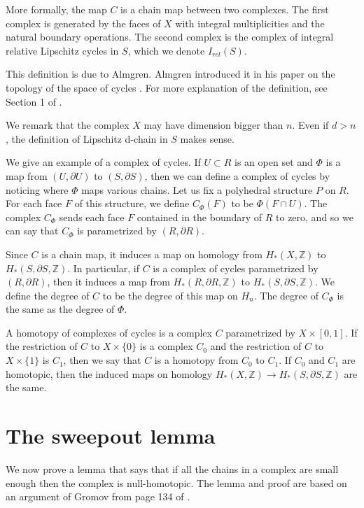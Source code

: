 \documentclass{amsart}
\newtheorem*{Theorem 1}{Theorem 1}
\newtheorem*{Theorem 2}{Theorem 2}
\newtheorem*{Estimate 1}{Estimate 1}
\newtheorem*{Estimate 2}{Estimate 2}
\newtheorem*{key lemma}{Key Lemma}
\numberwithin{equation}{section}
\begin{document}
More formally, the map $C$ is a chain map between two complexes. 
The first complex is generated by the faces of $X$ with integral
multiplicities and the natural boundary operations.  The second
complex is the complex of integral relative Lipschitz cycles in
$S$, which we denote $I_{rel}(S)$. 

This definition is due to Almgren.  Almgren introduced it in his
paper on the topology of the space of cycles \cite{A}.  
For more explanation of the definition, see Section 1 of \cite{G4}.

We remark that the complex $X$ may have dimension bigger than $n$.
Even if $d > n$, the definition of Lipschitz d-chain in $S$ makes
sense.

We give an example of a complex of cycles.  
If $U \subset R$ is an open set and $\Phi$ is a map
from $(U, \partial U)$ to $(S, \partial S)$, then we can define a
complex of cycles by noticing where $\Phi$ maps various chains. 
Let us fix a polyhedral structure $P$ on $R$.  For each face $F$
of this structure, we define $C_\Phi(F)$ to be $\Phi(F \cap U)$. 
The complex $C_\Phi$ sends each face $F$ contained in the
boundary of $R$ to zero, and so we can say that $C_\Phi$ is
parametrized by $(R, \partial R)$.

Since $C$ is a chain map, it induces a map on homology from
$H_*(X, \mathbb{Z})$ to $H_*(S, \partial S, \mathbb{Z})$.
In particular, if $C$ is a complex of cycles
parametrized by $(R, \partial R)$, then it induces a map from
$H_*(R, \partial R, \mathbb{Z})$ to $H_*(S, \partial S,
\mathbb{Z})$.  We define the degree of $C$ to be the degree of
this map on $H_n$.  The degree of $C_{\Phi}$ is the same as the
degree of $\Phi$.

A homotopy of complexes of cycles is a complex $C$ parametrized
by $X \times [0,1]$.  If the restriction of $C$ to $X \times \{ 0
\}$ is a complex $C_0$ and the restriction of $C$ to $X \times \{
1 \}$ is $C_1$, then we say that $C$ is a homotopy from $C_0$ to
$C_1$.  If $C_0$ and $C_1$ are homotopic, then the induced maps
on homology $H_*(X, \mathbb{Z}) \rightarrow H_*(S, \partial S,
\mathbb{Z})$ are the same.


\section{The sweepout lemma}

We now prove a lemma that says that if all the chains in a
complex are small enough then the complex is null-homotopic. 
The lemma and proof are based on an argument of Gromov from
page 134 of \cite{Gr}.
\end{document}
